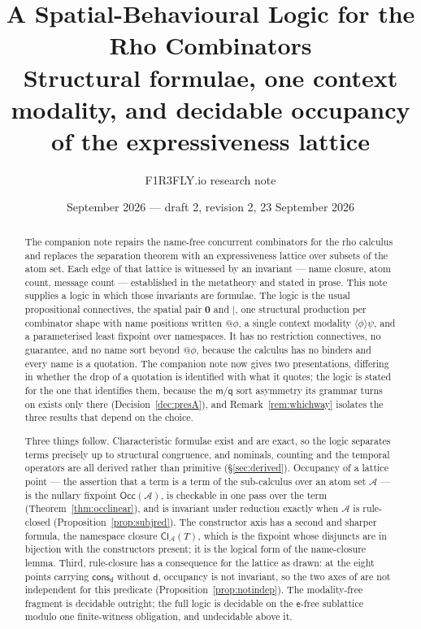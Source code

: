 \documentclass[11pt]{article}
\title{\textbf{A Spatial-Behavioural Logic for the Rho Combinators}\\[4pt]
\large Structural formulae, one context modality, and decidable occupancy
of the expressiveness lattice}
\author{F1R3FLY.io research note}
\date{September 2026 --- draft 2, revision 2, 23 September 2026}
\makeatletter
\theoremstyle{plain}
\theoremstyle{definition}
\theoremstyle{remark}
\newcommand{\quo}[1]{@#1}
\newcommand{\nil}{\mathbf{0}}
\newcommand{\mm}{\mathsf{m}}
\newcommand{\dd}{\mathsf{d}}
\newcommand{\ev}{\mathsf{e}}
\newcommand{\qq}{\mathsf{q}}
\newcommand{\cons}{\mathsf{cons}}
\newcommand{\consd}{\cons_{\dd}}
\newcommand{\may}[1]{\langle #1 \rangle}
\newcommand{\Occ}{\mathsf{Occ}}
\newcommand{\Cl}{\mathsf{Cl}}
\newcommand{\Atm}{\mathcal{A}}
\makeatother
\begin{document}
\maketitle

\begin{abstract}
\noindent
The companion note \cite{rhocomb3} repairs the name-free concurrent combinators
for the rho calculus and replaces the separation theorem with an expressiveness
lattice over subsets of the atom set. Each edge of that lattice is witnessed by
an invariant --- name closure, atom count, message count --- established in the
metatheory and stated in prose. This note supplies a logic in which those
invariants are formulae. The logic is the usual propositional connectives,
the spatial pair $\nil$ and $\mid$, one structural production per combinator
shape with name positions written $\quo{\phi}$, a single context modality
$\may{\phi}\psi$, and a parameterised least fixpoint over namespaces. It has no
restriction connectives, no guarantee, and no name sort beyond $\quo{\phi}$,
because the calculus has no binders and every name is a quotation. The
companion note now gives two presentations, differing in whether the drop of a
quotation is identified with what it quotes; the logic is stated for the one
that identifies them, because the $\mm$/$\qq$ sort asymmetry its grammar turns
on exists only there (Decision~\ref{dec:presA}), and
Remark~\ref{rem:whichway} isolates the three results that depend on the
choice.

Three things follow. Characteristic formulae exist and are exact, so the logic
separates terms precisely up to structural congruence, and nominals, counting
and the temporal operators are all derived rather than primitive
(\S\ref{sec:derived}). Occupancy of a lattice point --- the assertion that a
term is a term of the sub-calculus over an atom set $\Atm$ --- is the nullary
fixpoint $\Occ(\Atm)$, is checkable in one pass over the term
(Theorem~\ref{thm:occlinear}), and is invariant under reduction exactly when
$\Atm$ is rule-closed (Proposition~\ref{prop:subjred}). The constructor axis
has a second and sharper formula, the namespace closure $\Cl_{\Atm}(T)$, which
is the fixpoint whose disjuncts are in bijection with the constructors present;
it is the logical form of the name-closure lemma. Third, rule-closure has a
consequence for the lattice as drawn: at the eight points carrying $\consd$
without $\dd$, occupancy is not invariant, so the two axes of
\cite[Fig.~2]{rhocomb3} are not independent for this predicate
(Proposition~\ref{prop:notindep}). The modality-free fragment is decidable
outright; the full logic is decidable on the $\ev$-free sublattice modulo one
finite-witness obligation, and undecidable above it.


\end{abstract}
\end{document}
